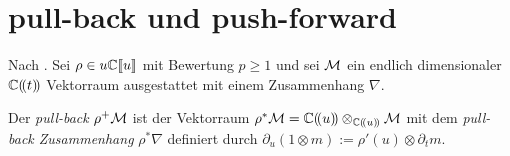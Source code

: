 \section{pull-back und push-forward}

Nach \cite[1.a]{sabbah_Fourier-local}. Sei $\rho\in u{\mathbb C\llbracket u\rrbracket}$ mit Bewertung
$p\geq1$ und sei $\mathcal{M}$ ein endlich dimensionaler $\mathbb{C}(\!(t)\!)$ Vektorraum
ausgestattet mit einem Zusammenhang $\nabla$.
\begin{defn}
  \cite[1.a]{sabbah_Fourier-local}
  Der \emph{pull-back} $\rho^{+}\mathcal{M}$ ist der Vektorraum
  $\rho^{*}\mathcal{M}=\mathbb{C}(\!(u)\!)\otimes_{\mathbb{C}(\!(u)\!)}\mathcal{M}$ mit dem \emph{pull-back
    Zusammenhang} $\rho^*\nabla$ definiert durch $\partial_u(1\otimes
  m):=\rho'(u)\otimes\partial_tm$.
\end{defn}

